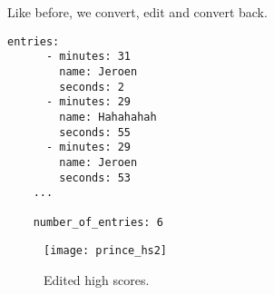 \documentclass[slidestop]{beamer}
\begin{document}
\begin{pframe}
  Like before, we convert, edit and convert back.
  \begin{lstlisting}[language=none, caption={Output snippet.}]
    entries:
      - minutes: 31
        name: Jeroen
        seconds: 2
      - minutes: 29
        name: Hahahahah
        seconds: 55
      - minutes: 29
        name: Jeroen
        seconds: 53
    ...

    number_of_entries: 6
  \end{lstlisting}
\end{pframe}

\begin{pframe}
  \begin{figure}[]
    \begin{center}
      \texttt{[image: prince\_hs2]}
    \end{center}
    \caption{Edited high scores.}
  \end{figure}
\end{pframe}

\end{document}
